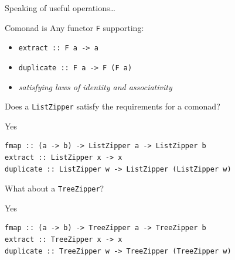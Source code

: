 \begin{frame}
\begin{center}
Speaking of useful operations\ldots
\end{center}
\end{frame}

\begin{frame}
\begin{block}{Comonad is}
Any functor \lstinline{F} supporting:
\begin{center}
\begin{itemize}
  \item \lstinline{extract :: F a -> a}
  \item \lstinline{duplicate :: F a -> F (F a)}
  \item \emph{satisfying laws of identity and associativity}
\end{itemize}
\end{center}
\end{block}
\end{frame}

\begin{frame}
\begin{center}
Does a \lstinline{ListZipper} satisfy the requirements for a comonad?
\end{center}
\end{frame}

\begin{frame}[fragile]
\begin{block}{Yes}
\begin{center}
\begin{lstlisting}[style=haskell]
fmap :: (a -> b) -> ListZipper a -> ListZipper b
extract :: ListZipper x -> x
duplicate :: ListZipper w -> ListZipper (ListZipper w)
\end{lstlisting}
\end{center}
\end{block}
\end{frame}

\begin{frame}
\begin{center}
What about a \lstinline{TreeZipper}?
\end{center}
\end{frame}

\begin{frame}[fragile]
\begin{block}{Yes}
\begin{center}
\begin{lstlisting}[style=haskell]
fmap :: (a -> b) -> TreeZipper a -> TreeZipper b
extract :: TreeZipper x -> x
duplicate :: TreeZipper w -> TreeZipper (TreeZipper w)
\end{lstlisting}
\end{center}
\end{block}
\end{frame}

